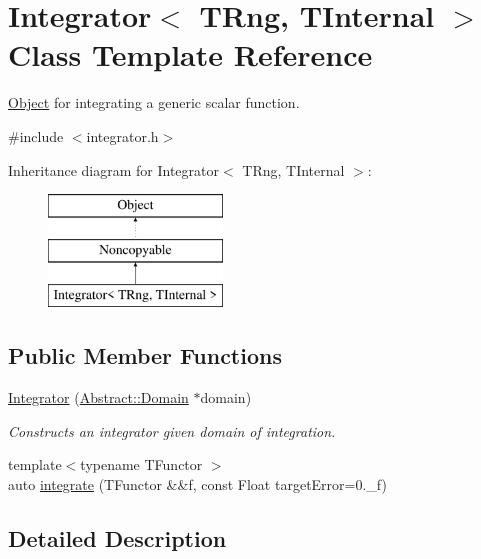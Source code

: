 \hypertarget{classIntegrator}{}\section{Integrator$<$ T\+Rng, T\+Internal $>$ Class Template Reference}
\label{classIntegrator}


\hyperlink{classObject}{Object} for integrating a generic scalar function.  




{\ttfamily \#include $<$integrator.\+h$>$}

Inheritance diagram for Integrator$<$ T\+Rng, T\+Internal $>$\+:\begin{figure}[H]
\begin{center}
\leavevmode
\includegraphics[height=3.000000cm]{classIntegrator}
\end{center}
\end{figure}
\subsection*{Public Member Functions}
\begin{DoxyCompactItemize}
\item 
\hypertarget{classIntegrator_a8f83bdb5012e5cea5b2cc566c2b4f207}{}\label{classIntegrator_a8f83bdb5012e5cea5b2cc566c2b4f207} 
\hyperlink{classIntegrator_a8f83bdb5012e5cea5b2cc566c2b4f207}{Integrator} (\hyperlink{classAbstract_1_1Domain}{Abstract\+::\+Domain} $\ast$domain)
\begin{DoxyCompactList}\small\item\em Constructs an integrator given domain of integration. \end{DoxyCompactList}\item 
{\footnotesize template$<$typename T\+Functor $>$ }\\auto \hyperlink{classIntegrator_adf117e3936f928bccd93ad41567acba8}{integrate} (T\+Functor \&\&f, const Float target\+Error=0.\+\_\+f)
\end{DoxyCompactItemize}


\subsection{Detailed Description}
